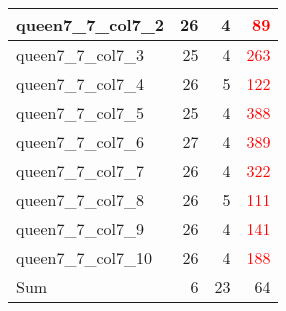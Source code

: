 \begin{longtable}{l|r|r|r}
  queen7\_7\_col7\_2 & 26 & 4 & \textcolor{red}{89} \\ \hline
  queen7\_7\_col7\_3 & 25 & 4 & \textcolor{red}{263} \\ \hline
  queen7\_7\_col7\_4 & 26 & 5 & \textcolor{red}{122} \\ \hline
  queen7\_7\_col7\_5 & 25 & 4 & \textcolor{red}{388} \\ \hline
  queen7\_7\_col7\_6 & 27 & 4 & \textcolor{red}{389} \\ \hline
  queen7\_7\_col7\_7 & 26 & 4 & \textcolor{red}{322} \\ \hline
  queen7\_7\_col7\_8 & 26 & 5 & \textcolor{red}{111} \\ \hline
  queen7\_7\_col7\_9 & 26 & 4 & \textcolor{red}{141} \\ \hline
  queen7\_7\_col7\_10 & 26 & 4 & \textcolor{red}{188} \\ \hline \hline
  Sum & 6 & 23 & 64 \\ \hline
\end{longtable}